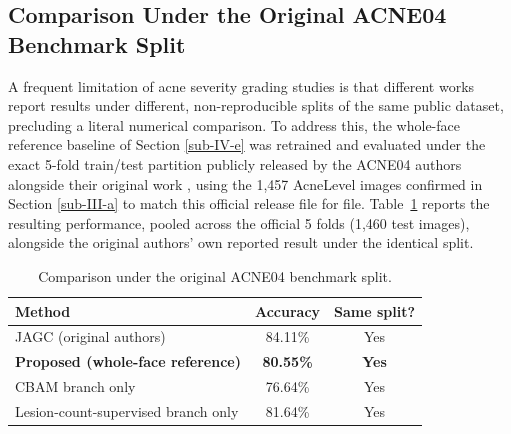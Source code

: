 \documentclass[conference]{IEEEtran}
\begin{document}
\FloatBarrier
\subsection{Comparison Under the Original ACNE04 Benchmark Split}\label{sub-IV-f}

A frequent limitation of acne severity grading studies is that different works report results under different, non-reproducible splits of the same public dataset, precluding a literal numerical comparison. To address this, the whole-face reference baseline of Section \ref{sub-IV-e} was retrained and evaluated under the exact 5-fold train/test partition publicly released by the ACNE04 authors alongside their original work \cite{b30}, using the 1,457 AcneLevel images confirmed in Section \ref{sub-III-a} to match this official release file for file. Table~\ref{tab:official} reports the resulting performance, pooled across the official 5 folds (1,460 test images), alongside the original authors' own reported result under the identical split.

\begin{table}[H]
\caption{Comparison under the original ACNE04 benchmark split.}
\begin{center}
\small
\begin{tabular}{|l|c|c|}
\hline
\textbf{Method} & \textbf{Accuracy} & \textbf{Same split?} \\
\hline
JAGC \cite{b30} (original authors) & 84.11\% & Yes \\
\hline
\textbf{Proposed (whole-face reference)} & \textbf{80.55\%} & \textbf{Yes} \\
\hline
\quad CBAM branch only & 76.64\% & Yes \\
\hline
\quad Lesion-count-supervised branch only & 81.64\% & Yes \\
\hline
\end{tabular}
\label{tab:official}
\end{center}
\end{table}
\end{document}
